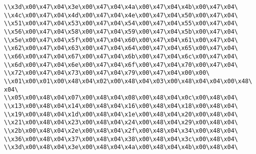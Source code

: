 \verb|\\x3d\x00\x47\x04\x3e\x00\x47\x04\x4a\x00\x47\x04\x4b\x00\x47\x04\|\newline
\verb|\\x4c\x00\x47\x04\x4d\x00\x47\x04\x4e\x00\x47\x04\x50\x00\x47\x04\|\newline
\verb|\\x51\x00\x47\x04\x53\x00\x47\x04\x54\x00\x47\x04\x55\x00\x47\x04\|\newline
\verb|\\x56\x00\x47\x04\x58\x00\x47\x04\x59\x00\x47\x04\x5b\x00\x47\x04\|\newline
\verb|\\x5e\x00\x47\x04\x5f\x00\x47\x04\x60\x00\x47\x04\x61\x00\x47\x04\|\newline
\verb|\\x62\x00\x47\x04\x63\x00\x47\x04\x64\x00\x47\x04\x65\x00\x47\x04\|\newline
\verb|\\x66\x00\x47\x04\x67\x00\x47\x04\x6b\x00\x47\x04\x6c\x00\x47\x04\|\newline
\verb|\\x6d\x00\x47\x04\x6e\x00\x47\x04\x6f\x00\x47\x04\x70\x00\x47\x04\|\newline
\verb|\\x72\x00\x47\x04\x73\x00\x47\x04\x79\x00\x47\x04\x00\x00\|\newline
\verb|\\x01\x00\x01\x00\x48\x04\x02\x00\x48\x04\x03\x00\x48\x04\x04\x00\x48\x04\|\newline
\verb|\\x05\x00\x48\x04\x07\x00\x48\x04\x08\x00\x48\x04\x0c\x00\x48\x04\|\newline
\verb|\\x13\x00\x48\x04\x14\x00\x48\x04\x16\x00\x48\x04\x18\x00\x48\x04\|\newline
\verb|\\x19\x00\x48\x04\x1d\x00\x48\x04\x1e\x00\x48\x04\x20\x00\x48\x04\|\newline
\verb|\\x21\x00\x48\x04\x23\x00\x48\x04\x24\x00\x48\x04\x29\x00\x48\x04\|\newline
\verb|\\x2b\x00\x48\x04\x2e\x00\x48\x04\x2f\x00\x48\x04\x34\x00\x48\x04\|\newline
\verb|\\x36\x00\x48\x04\x37\x00\x48\x04\x38\x00\x48\x04\x3c\x00\x48\x04\|\newline
\verb|\\x3d\x00\x48\x04\x3e\x00\x48\x04\x4a\x00\x48\x04\x4b\x00\x48\x04\|\newline
